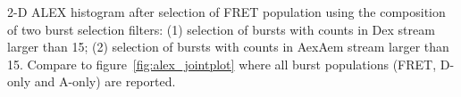 \label{fig:alex_jointplot_fretsel} 2-D ALEX histogram after selection of FRET population 
using the composition of two burst selection filters: 
(1) selection of bursts with counts in Dex stream larger than 15;
(2) selection of bursts with counts in AexAem stream larger than 15.
Compare to figure~\ref{fig:alex_jointplot} where all burst populations 
(FRET, D-only and A-only) are reported.
